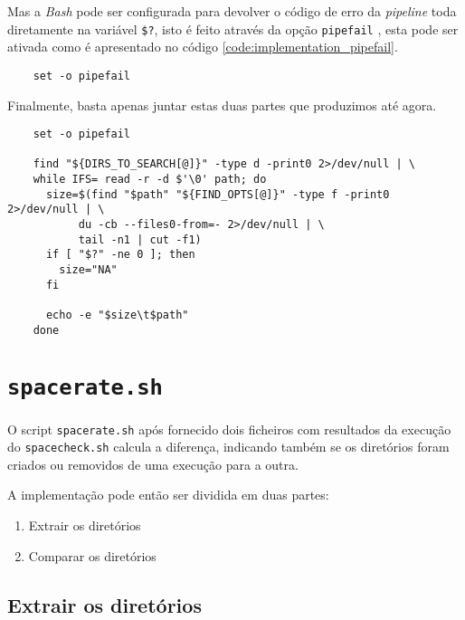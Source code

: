 Mas a \emph{Bash} pode ser configurada para devolver o código de erro da
\emph{pipeline} toda diretamente na variável \Verb|$?|, isto é feito através da
opção \Verb|pipefail| \cite{bash_man}, esta pode ser ativada como é apresentado
no código \ref{code:implementation_pipefail}.

\begin{listing}[H]
	\centering
	\begin{verbatim}
    set -o pipefail
  \end{verbatim}
	\cprotect\caption{Ativação da opção \Verb|pipefail|}
	\label{code:implementation_pipefail}
\end{listing}

Finalmente, basta apenas juntar estas duas partes que produzimos até agora.

\begin{listing}[H]
	\centering
	\begin{verbatim}
    set -o pipefail

    find "${DIRS_TO_SEARCH[@]}" -type d -print0 2>/dev/null | \
    while IFS= read -r -d $'\0' path; do
      size=$(find "$path" "${FIND_OPTS[@]}" -type f -print0  2>/dev/null | \
           du -cb --files0-from=- 2>/dev/null | \
           tail -n1 | cut -f1)
      if [ "$?" -ne 0 ]; then
        size="NA"
      fi

      echo -e "$size\t$path"
    done
  \end{verbatim}
	\cprotect\caption{Implementação do algoritmo principal do \Verb|spacecheck.sh|}
\end{listing}

\cprotect\section{\Verb|spacerate.sh|}

O script \Verb|spacerate.sh| após fornecido dois ficheiros com resultados da
execução do \Verb|spacecheck.sh| calcula a diferença, indicando também se os
diretórios foram criados ou removidos de uma execução para a outra.

A implementação pode então ser dividida em duas partes:

\begin{enumerate}
	\item Extrair os diretórios
	\item Comparar os diretórios
\end{enumerate}

\subsection{Extrair os diretórios}


